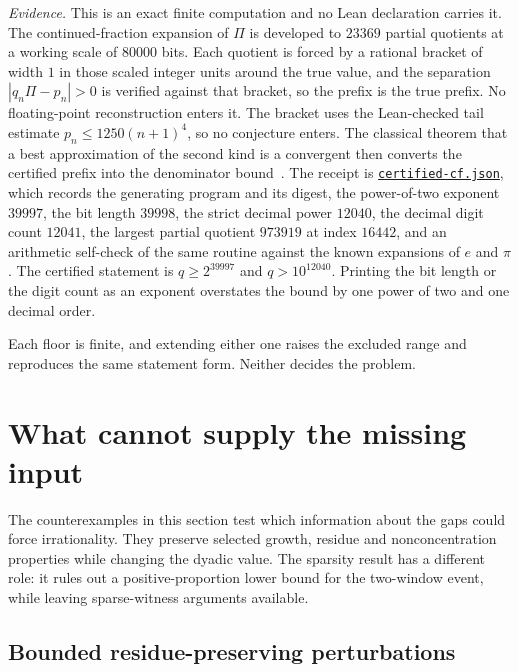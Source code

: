 \documentclass[11pt]{article}
\begin{document}
\emph{Evidence.}  This is an exact finite computation and no Lean declaration
carries it.  The continued-fraction expansion of $\Pi$ is developed to $23369$
partial quotients at a working scale of $80000$ bits.  Each quotient is forced
by a rational bracket of width $1$ in those scaled integer units around the
true value, and the separation $|q_n\Pi-p_n|>0$ is verified against that
bracket, so the prefix is the true prefix.  No floating-point reconstruction
enters it.  The bracket uses the Lean-checked tail estimate
$p_n\le1250(n+1)^4$, so no conjecture enters.  The classical theorem that a
best approximation of the second kind is a convergent then converts the
certified prefix into the denominator bound~\cite{khinchin1964}.  The receipt
is \href{https://github.com/wcook04/plectis-erdos/blob/dd6cc708f650f061de06594eba6ba43878f4de31/research/experiments/erdos251/receipts/certified-cf.json}{\texttt{certified-cf.json}},
which records the generating program and its digest, the power-of-two exponent
$39997$, the bit length $39998$, the strict decimal power $12040$, the decimal
digit count $12041$, the largest partial quotient $973919$ at index $16442$,
and an arithmetic self-check of the same routine against the known expansions
of $e$ and $\pi$.  The certified statement is $q\ge2^{39997}$ and
$q>10^{12040}$.  Printing the bit length or the digit count as an exponent
overstates the bound by one power of two and one decimal order.

Each floor is finite, and extending either one raises the excluded range and
reproduces the same statement form.  Neither decides the problem.

\section{What cannot supply the missing input}\label{long251:sec:obstructions}

The counterexamples in this section test which information about the gaps
could force irrationality.  They preserve selected growth, residue and
nonconcentration properties while changing the dyadic value.  The sparsity
result has a different role: it rules out a positive-proportion lower bound
for the two-window event, while leaving sparse-witness arguments available.

\subsection{Bounded residue-preserving perturbations}
\end{document}
